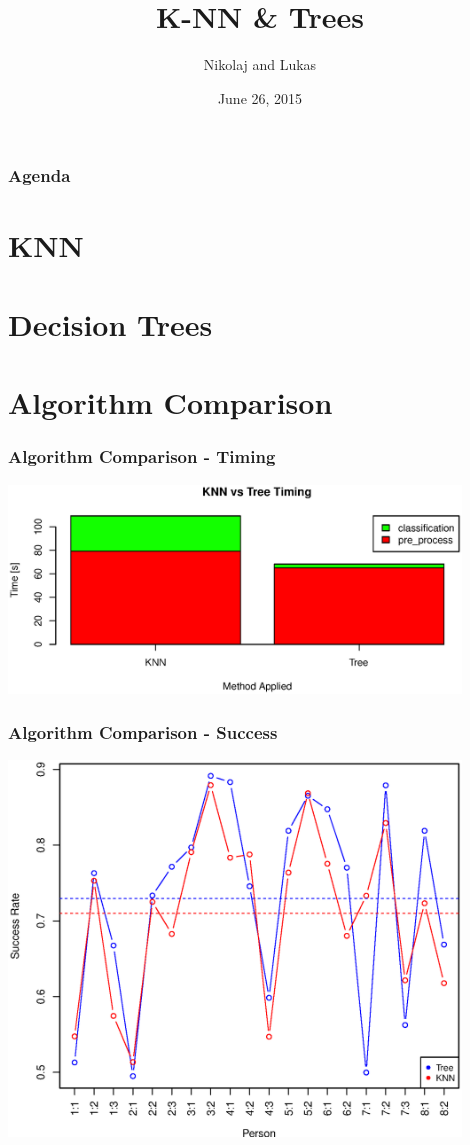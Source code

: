 \documentclass[12pt,a4paper]{beamer}
\begin{document}
\begin{frame}
\author{Nikolaj and Lukas}
\date{June 26, 2015}
\title{K-NN \& Trees}
\maketitle
\end{frame}

\begin{frame}
\frametitle{Agenda}
\tableofcontents
\end{frame}

\centering
\section{KNN}


\section{Decision Trees}

% 
% 
% 
% 
% 
% 


\section{Algorithm Comparison}
\begin{frame}
\frametitle{Algorithm Comparison - Timing}
\includegraphics[width=0.9\textwidth]{../Report/graphics/algo_compare_timing}
\end{frame}

\begin{frame}
\frametitle{Algorithm Comparison - Success}
\includegraphics[width=0.9\textwidth]{../Report/graphics/success_comp_hard}
\end{frame}
\end{document}
